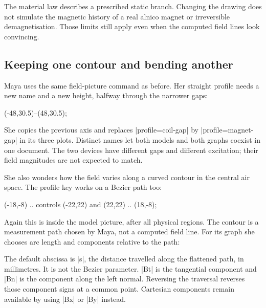 The material law describes a prescribed static branch. Changing the drawing
does not simulate the magnetic history of a real alnico magnet or irreversible
demagnetisation. Those limits still apply even when the computed field lines
look convincing.

\subsection{Keeping one contour and bending another}

Maya uses the same field-picture command as before. Her straight profile needs
a new name and a new height, halfway through the narrower gaps:
\begin{codeexample}
\draw[femm/profile={name=magnet-gap,samples=101},
  violet,dashed,thick,-Stealth] (-48,30.5)--(48,30.5);
\end{codeexample}
She copies the previous axis and replaces |profile=coil-gap| by
|profile=magnet-gap| in its three plots. Distinct names let both models and
both graphs coexist in one document. The two devices have different gaps and
different excitation; their field magnitudes are not expected to match.

She also wonders how the field varies along a curved contour in the central
air space. The profile key works on a Bezier path too:
\begin{codeexample}
\draw[femm/profile={name=magnet-arc,samples=101,
  curve tolerance=.03},orange!85!black,dashed,thick,-Stealth]
  (-18,-8) .. controls (-22,22) and (22,22) .. (18,-8);
\end{codeexample}
Again this is inside the model picture, after all physical regions. The
contour is a measurement path chosen by Maya, not a computed field line.
For its graph she chooses arc length and components relative to the path:
\begin{codeexample}
\end{codeexample}
The default abscissa is |s|, the distance travelled along the flattened path,
in millimetres. It is not the Bezier parameter. |Bt| is the tangential component
and |Bn| is the component along the left normal. Reversing the traversal
reverses those component signs at a common point. Cartesian components remain
available by using |Bx| or |By| instead.


